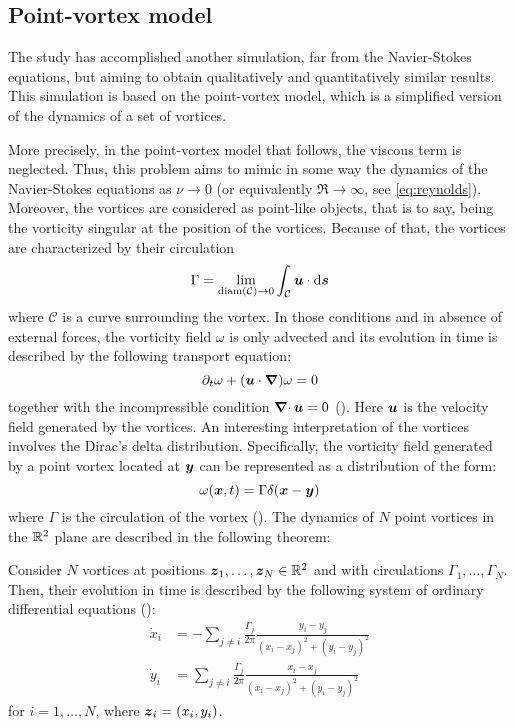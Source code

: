 \documentclass[../main.tex]{subfiles}
\begin{document}
\subsection{Point-vortex model}
The study has accomplished another simulation, far from the Navier-Stokes equations, but aiming to obtain qualitatively and quantitatively similar results. This simulation is based on the point-vortex model, which is a simplified version of the dynamics of a set of vortices.

More precisely, in the point-vortex model that follows, the viscous term is neglected. Thus, this problem aims to mimic in some way the dynamics of the Navier-Stokes equations as $\nu \to 0$ (or equivalently $\Re\to\infty$, see \cref{eq:reynolds}). Moreover, the vortices are considered as point-like objects, that is to say, being the vorticity singular at the position of the vortices. Because of that, the vortices are characterized by their circulation
\begin{equation}
	\Gamma = \lim_{\operatorname{diam}(\mathcal{C})\to 0} \int_{\mathcal{C}} \boldsymbol{u} \cdot \dd{\boldsymbol{s}}
\end{equation}
where $\mathcal{C}$ is a curve surrounding the vortex. In those conditions and in absence of external forces, the vorticity field $\omega$ is only advected and its evolution in time is described by the following transport equation:
\begin{equation}
	\partial_t \omega + (\boldsymbol{u} \cdot \grad) \omega = 0
\end{equation}
together with the incompressible condition $\operatorname{\boldsymbol{\nabla}\cdot} \boldsymbol{u}=0$ (\cite{pointvortexmath}). Here $\boldsymbol{u}$ is the velocity field generated by the vortices. An interesting interpretation of the vortices involves the Dirac's delta distribution. Specifically, the vorticity field generated by a point vortex located at $\boldsymbol{y}$ can be represented as a distribution of the form:
\begin{equation}\label{eq:vorticity_delta}
	\omega(\boldsymbol{x}, t) = \Gamma \delta(\boldsymbol{x}-\boldsymbol{y})
\end{equation}
where $\Gamma$ is the circulation of the vortex (\cite{Saffman}). The dynamics of $N$ point vortices in the $\mathbb{R}^2$ plane are described in the following theorem:
\\
\begin{theorem}
	Consider $N$ vortices at positions $\boldsymbol{z}_1,\ldots,\boldsymbol{z}_N\in \mathbb{R}^2$ and with circulations $\Gamma_1,\ldots,\Gamma_N$. Then, their evolution in time is described by the following system of ordinary differential equations (\cite{pointvortex}):
	\begin{align}\label{eq:pointvortexA}
		\dot{x}_i & = -\sum_{j\neq i} \frac{\Gamma_j}{2\pi} \frac{y_i-y_j}{{(x_i-x_j)}^2+{(y_i-y_j)}^2} \\
		\label{eq:pointvortexB}
		\dot{y}_i & = \sum_{j\neq i} \frac{\Gamma_j}{2\pi} \frac{x_i-x_j}{{(x_i-x_j)}^2+{(y_i-y_j)}^2}
	\end{align}
	for $i=1,\ldots,N$, where $\boldsymbol{z}_i=(x_i,y_i)$.
\end{theorem}
\end{document}
